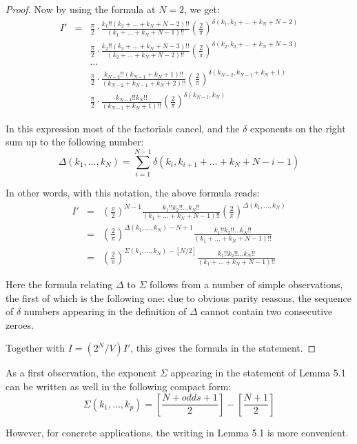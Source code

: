 \documentclass[12pt]{amsart}
\begin{document}
\begin{proof}
Now by using the formula at $N=2$, we get:
\begin{eqnarray*}
I'
&=&\frac{\pi}{2}\cdot\frac{k_1!!(k_2+\ldots+k_N+N-2)!!}{(k_1+\ldots+k_N+N-1)!!}\left(\frac{2}{\pi}\right)^{\delta(k_1,k_2+\ldots+k_N+N-2)}\\
&&\frac{\pi}{2}\cdot\frac{k_2!!(k_3+\ldots+k_N+N-3)!!}{(k_2+\ldots+k_N+N-2)!!}\left(\frac{2}{\pi}\right)^{\delta(k_2,k_3+\ldots+k_N+N-3)}\\
&&\ldots\\
&&\frac{\pi}{2}\cdot\frac{k_{N-2}!!(k_{N-1}+k_N+1)!!}{(k_{N-2}+k_{N-1}+k_N+2)!!}\left(\frac{2}{\pi}\right)^{\delta(k_{N-2},k_{N-1}+k_N+1)}\\
&&\frac{\pi}{2}\cdot\frac{k_{N-1}!!k_N!!}{(k_{N-1}+k_N+1)!!}\left(\frac{2}{\pi}\right)^{\delta(k_{N-1},k_N)}
\end{eqnarray*}

In this expression most of the factorials cancel, and the $\delta$ exponents on the right sum up to the following number:
$$\Delta(k_1,\ldots,k_N)=\sum_{i=1}^{N-1}\delta(k_i,k_{i+1}+\ldots+k_N+N-i-1)$$

In other words, with this notation, the above formula reads:
\begin{eqnarray*}
I'
&=&\left(\frac{\pi}{2}\right)^{N-1}\frac{k_1!!k_2!!\ldots k_N!!}{(k_1+\ldots+k_N+N-1)!!}\left(\frac{2}{\pi}\right)^{\Delta(k_1,\ldots,k_N)}\\
&=&\left(\frac{2}{\pi}\right)^{\Delta(k_1,\ldots,k_N)-N+1}\frac{k_1!!k_2!!\ldots k_N!!}{(k_1+\ldots+k_N+N-1)!!}\\
&=&\left(\frac{2}{\pi}\right)^{\Sigma(k_1,\ldots,k_N)-[N/2]}\frac{k_1!!k_2!!\ldots k_N!!}{(k_1+\ldots+k_N+N-1)!!}
\end{eqnarray*}

Here the formula relating $\Delta$ to $\Sigma$ follows from a number of simple observations, the first of which is the following one: due to obvious parity reasons, the sequence of $\delta$ numbers appearing in the definition of $\Delta$ cannot contain two consecutive zeroes.

Together with $I=(2^N/V)I'$, this gives the formula in the statement.
\end{proof}

As a first observation, the exponent $\Sigma$ appearing in the statement of Lemma 5.1 can be written as well in the following compact form:
$$\Sigma(k_1,\ldots,k_p)=\left[\frac{N+odds+1}{2}\right]-\left[\frac{N+1}{2}\right]$$

However, for concrete applications, the writing in Lemma 5.1 is more convenient.
\end{document}
